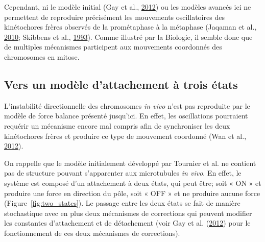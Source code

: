 \documentclass[12pt,a4paper,twoside,openright]{book}
\begin{document}
Cependant, ni le modèle initial (Gay et al.,
\hyperref[ref-Gay2012a]{2012}) ou les modèles avancés ici ne permettent
de reproduire précisément les mouvements oscillatoires des kinétochores
frères observés de la prométaphase à la métaphase (Jaqaman et al.,
\hyperref[ref-Jaqaman2010]{2010}; Skibbens et al.,
\hyperref[ref-Skibbens1993]{1993}). Comme illustré par la Biologie, il
semble donc que de multiples mécanismes participent aux mouvements
coordonnés des chromosomes en mitose.

\subsection{Vers un modèle d'attachement à trois
états}\label{vers-un-moduxe8le-dattachement-uxe0-trois-uxe9tats}

\label{sec:three-state}

L'instabilité directionnelle des chromosomes \emph{in vivo} n'est pas
reproduite par le modèle de force balance présenté jusqu'ici. En effet,
les oscillations pourraient requérir un mécanisme encore mal compris
afin de synchroniser les deux kinétochores frères et produire ce type de
mouvement coordonné (Wan et al., \hyperref[ref-Wan2012]{2012}).

On rappelle que le modèle initialement développé par Tournier et al. ne
contient pas de structure pouvant s'apparenter aux microtubules \emph{in
vivo}. En effet, le système est composé d'un attachement à deux états,
qui peut être; soit « ON » et produire une force en direction du pôle,
soit « OFF » et ne produire aucune force (Figure~\ref{fig:two_states}).
Le passage entre les deux états se fait de manière stochastique avec en
plus deux mécanismes de corrections qui peuvent modifier les constantes
d'attachement et de détachement (voir Gay et al.
(\hyperref[ref-Gay2012a]{2012}) pour le fonctionnement de ces deux
mécanismes de corrections).
\end{document}
